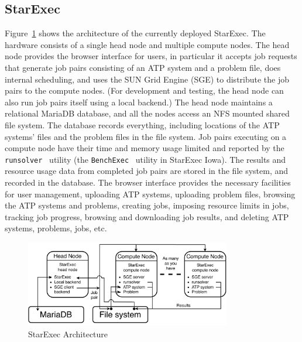 \documentclass{easychair}
\begin{document}
\subsection{StarExec}
\label{StarExec}

Figure~\ref{ArchitectureS} shows the architecture of the currently deployed StarExec.
The hardware consists of a single head node and multiple compute nodes.
The head node provides the browser interface for users, in particular it accepts job requests
that generate job pairs consisting of an ATP system and a problem file, does internal scheduling,
and uses the SUN Grid Engine (SGE) to distribute the job pairs to the compute nodes.
(For development and testing, the head node can also run job pairs itself using a local backend.)
The head node maintains a relational MariaDB database, and all the nodes access an NFS mounted
shared file system.
The database records everything, including locations of the ATP systems' files and the problem 
files in the file system. 
Job pairs executing on a compute node have their time and memory usage limited and reported
by the {\tt runsolver}~\cite{Rou11} utility (the {\tt BenchExec}~\cite{BLW19} utility in 
StarExec Iowa).
The results and resource usage data from completed job pairs are stored in the file system, 
and recorded in the database.
The browser interface provides the necessary facilities for user management, uploading ATP 
systems, uploading problem
files, browsing the ATP systems and problems, creating jobs, imposing resource limits in jobs,
tracking job progress, browsing and downloading job results, and deleting ATP systems, problems, 
jobs, etc.

\begin{figure}[htb]
\begin{center}
\includegraphics[width=0.8\textwidth]{ArchitectureS}
\caption{StarExec Architecture}
\label{ArchitectureS}
\end{center}
\end{figure}
\end{document}
